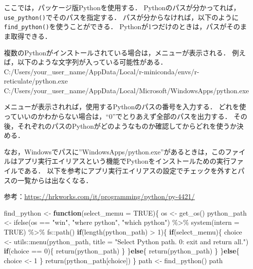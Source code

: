\documentclass[
]{article}
\newenvironment{Shaded}{\begin{snugshade}}{\end{snugshade}}
\newcommand{\AttributeTok}[1]{\textcolor[rgb]{0.77,0.63,0.00}{#1}}
\newcommand{\ConstantTok}[1]{\textcolor[rgb]{0.00,0.00,0.00}{#1}}
\newcommand{\ControlFlowTok}[1]{\textcolor[rgb]{0.13,0.29,0.53}{\textbf{#1}}}
\newcommand{\DecValTok}[1]{\textcolor[rgb]{0.00,0.00,0.81}{#1}}
\newcommand{\FunctionTok}[1]{\textcolor[rgb]{0.00,0.00,0.00}{#1}}
\newcommand{\NormalTok}[1]{#1}
\newcommand{\OtherTok}[1]{\textcolor[rgb]{0.56,0.35,0.01}{#1}}
\newcommand{\SpecialCharTok}[1]{\textcolor[rgb]{0.00,0.00,0.00}{#1}}
\newcommand{\StringTok}[1]{\textcolor[rgb]{0.31,0.60,0.02}{#1}}
\begin{document}
ここでは，パッケージ版Pythonを使用する．
Pythonのパスが分かってれば，\texttt{use\_python()}でそのパスを指定する．
パスが分からなければ，以下のように\texttt{find\_python()}を使うことができる．
Pythonが1つだけのときは，パスがそのまま取得できる．

複数のPythonがインストールされている場合は，メニューが表示される．
例えば，以下のような文字列が入っている可能性がある．
C:/Users/your\_user\_name/AppData/Local/r-miniconda/envs/r-reticulate/python.exe
C:/Users/your\_user\_name/AppData/Local/Microsoft/WindowsApps/python.exe

メニューが表示されれば，使用するPythonのパスの番号を入力する．
どれを使っていいのかわからない場合は，``0''でとりあえず全部のパスを出力する．
その後，それぞれのパスのPythonがどのようなものか確認してからどれを使うか決める．

なお，Windowsでパスに''WindowsApps/python.exe''があるときは，このファイルはアプリ実行エイリアスという機能でPythonをインストールための実行ファイルである．
以下を参考にアプリ実行エイリアスの設定でチェックを外すとパスの一覧からは出なくなる．

参考：\url{https://hrkworks.com/it/programming/python/py-4421/}

\begin{Shaded}
\begin{Highlighting}[]
\NormalTok{find\_python }\OtherTok{\textless{}{-}} \ControlFlowTok{function}\NormalTok{(}\AttributeTok{select\_memu =} \ConstantTok{TRUE}\NormalTok{)\{}
\NormalTok{  os }\OtherTok{\textless{}{-}} \FunctionTok{get\_os}\NormalTok{()}
\NormalTok{  python\_path }\OtherTok{\textless{}{-}} 
    \FunctionTok{ifelse}\NormalTok{(os }\SpecialCharTok{==} \StringTok{"win"}\NormalTok{, }\StringTok{"where python"}\NormalTok{, }\StringTok{"which python"}\NormalTok{) }\SpecialCharTok{\%\textgreater{}\%}
    \FunctionTok{system}\NormalTok{(}\AttributeTok{intern =} \ConstantTok{TRUE}\NormalTok{) }\SpecialCharTok{\%\textgreater{}\%}
\NormalTok{    fs}\SpecialCharTok{::}\FunctionTok{path}\NormalTok{()}
  \ControlFlowTok{if}\NormalTok{(}\FunctionTok{length}\NormalTok{(python\_path) }\SpecialCharTok{\textgreater{}} \DecValTok{1}\NormalTok{)\{}
    \ControlFlowTok{if}\NormalTok{(select\_memu)\{}
\NormalTok{      choice }\OtherTok{\textless{}{-}}\NormalTok{ utils}\SpecialCharTok{::}\FunctionTok{menu}\NormalTok{(python\_path, }\AttributeTok{title =} \StringTok{"Select Python path. 0: exit and return all."}\NormalTok{)}
      \ControlFlowTok{if}\NormalTok{(choice }\SpecialCharTok{==} \DecValTok{0}\NormalTok{)\{ }\FunctionTok{return}\NormalTok{(python\_path) \}}
\NormalTok{    \}}\ControlFlowTok{else}\NormalTok{\{}
      \FunctionTok{return}\NormalTok{(python\_path)}
\NormalTok{    \}}
\NormalTok{  \}}\ControlFlowTok{else}\NormalTok{\{}
\NormalTok{    choice }\OtherTok{\textless{}{-}} \DecValTok{1}
\NormalTok{  \}}
  \FunctionTok{return}\NormalTok{(python\_path[choice])}
\NormalTok{\}}
\NormalTok{path }\OtherTok{\textless{}{-}} \FunctionTok{find\_python}\NormalTok{()}
\NormalTok{path}
\end{Highlighting}
\end{Shaded}
\end{document}
